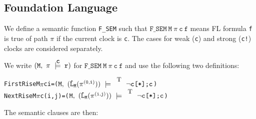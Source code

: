 \documentclass{llncs}
\newcommand{\T}{\texttt{\small\rm{T}}}
\newcommand{\bTrue}{\T}
\renewcommand{\Pi}{\(\pi\)}
\newcommand{\SSem}[4]{(\(\tt{#1,~#2~\models^{\hspace*{-2.3mm}\raisebox{1mm}{\tt#3}}~#4}\))}
\newcommand{\fSem}[4]{(\tt{#1,~#2~\models^{\hspace*{-2.3mm}\raisebox{1mm}{\tt#3}}~#4})}
\newcommand{\Fsem}{\texttt{F\_SEM}\xspace}
\newcommand{\bNot}[1]{\neg#1}
\newcommand{\pathSeg}[2]{#1^{#2}}
\newcommand{\lHat}[1]{\hat{\texttt{L}}_{#1}}
\newcommand{\sBool}[1]{#1}
\newcommand{\sRepeat}[1]{#1\texttt{[*]}}
\newcommand{\sCat}[2]{#1\texttt{;}#2}
\renewcommand{\t}[1]{\texttt{#1}}
\begin{document}
\vspace*{-8mm}

\subsection{Foundation Language}\label{FL}

\vspace*{-2mm}

We define a semantic function \Fsem such that $\Fsem~\t{M}~\pi~\t{c}~\t{f}$
means FL formula \t{f} is true of path $\pi$ if the current clock is \t{c}.
The cases for weak (\t{c}) and strong (\t{c!}) clocks are considered separately.

\noindent We write $\fSem{M}{\pi}{c}{r}$ for $\Fsem~\t{M}~\pi~\t{c}~\t{f}$
and use the following two definitions:

\vspace*{-4.5mm}

{\begin{alltt}
   FirstRise M {\Pi} c i    = \SSem{M}{(\lHat{M} (\pathSeg{\pi}{(0,i)}))}{\bTrue}{\sCat{\sRepeat{\sBool{\bNot{c}}}}{\sBool{c}}}
   NextRise M {\Pi} c (i,j) = \SSem{M}{(\lHat{M} (\pathSeg{\pi}{(i,j)}))}{\bTrue}{\sCat{\sRepeat{\sBool{\bNot{c}}}}{\sBool{c}}}
\end{alltt}}

\vspace*{-3.5mm}

\noindent The semantic clauses are then:

\vspace*{-3.5mm}
\end{document}
